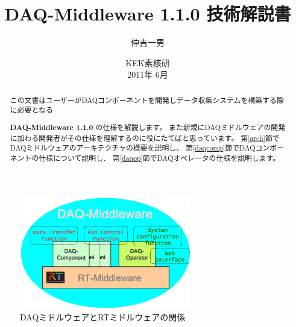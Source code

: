 \documentclass[a4j,10pt,dvips,onecolumn,oneside,final]{jarticle}%
\newcommand {\daqmwcurrent} {
	{\bf DAQ-Middleware 1.1.0}
}
\begin{document}
\title{ \daqmwcurrent 技術解説書\\
}
\author{仲吉一男}
\date{
\vspace{0.1cm}
  KEK素核研\\
\vspace{0.4cm}
  2011年 6月 
}
\maketitle
\begin{abstract}
この文書はユーザーがDAQコンポーネントを開発しデータ収集システムを構築する際に必要となる
\daqmwcurrent の仕様を解説します。
また新規にDAQミドルウェアの開発に加わる開発者がその仕様を理解するのに役にたてばと思っています。
第\ref{arch}節でDAQミドルウェアのアーキテクチャの概要を説明し、
第\ref{daqcomp}節でDAQコンポーネントの仕様について説明し、
第\ref{daqop}節でDAQオペレータの仕様を説明します。

\end{abstract}
{\rm }
\tableofcontents
\newpage

\begin{figure}
  \begin{center}
   \includegraphics[width=75mm]{daqmw-rtmw.eps}
  \end{center}
  \vspace{-7mm}
  \caption{\footnotesize DAQミドルウェアとRTミドルウェアの関係}
  \label{daqmw.fig}
\end{figure}
\end{document}
